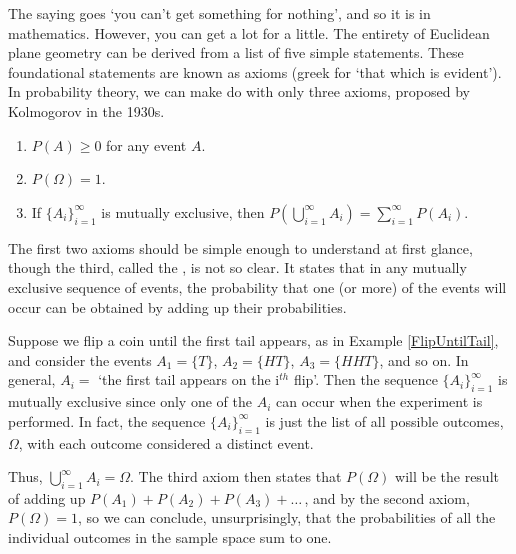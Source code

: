 The saying goes `you can't get something for nothing', and so it is in mathematics. However, you can get a lot for a little. The entirety of Euclidean plane geometry can be derived from a list of five simple statements. These foundational statements are known as axioms (greek for `that which is evident'). In probability theory, we can make do with only three axioms, proposed by Kolmogorov \cite{KolmogorovFoundations} in the 1930s. 
\begin{enumerate}
\item $P(A) \geq 0$ for any event $A$.
\item $P(\Omega) = 1$.
\vspace*{-7pt}
\item If $\{A_i\}_{i=1}^{\infty}$ is mutually exclusive, then $\displaystyle P\left(\bigcup_{i=1}^{\infty} A_i\right) = \sum_{i=1}^{\infty} P(A_i)$.
\end{enumerate}
\par
The first two axioms should be simple enough to understand at first glance, though the third, called the , is not so clear. It states that in any mutually exclusive sequence of events, the probability that one (or more) of the events will occur can be obtained by adding up their probabilities.
\par
\begin{examp}\label{flipuntiltailsumoutcomes}
Suppose we flip a coin until the first tail appears, as in Example \ref{FlipUntilTail}, and consider the events $A_1 = \{T\}$, $A_2 = \{HT\}$, $A_3 = \{HHT\}$, and so on. In general, $A_i =$ `the first tail appears on the i$^{th}$ flip'. Then the sequence $\{A_i\}_{i=1}^{\infty}$ is mutually exclusive since only one of the $A_i$ can occur when the experiment is performed. In fact, the sequence $\{A_i\}_{i=1}^{\infty}$ is just the list of all possible outcomes, $\Omega$, with each outcome considered a distinct event.
\par
\noindent Thus, $\bigcup_{i=1}^{\infty}A_i = \Omega$. The third axiom then states that $P(\Omega)$ will be the result of adding up $P(A_1) + P(A_2) + P(A_3) + \dots\,$, and by the second axiom, $P(\Omega) = 1$, so we can conclude, unsurprisingly, that the probabilities of all the individual outcomes in the sample space sum to one.
\end{examp}
\par
